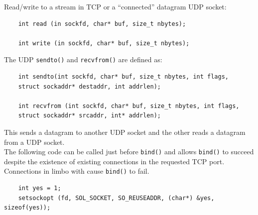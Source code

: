 \documentclass[twoside]{article}
\begin{document}
Read/write to a stream in TCP or a ``connected'' datagram UDP socket:
\begin{lstlisting}
    int read (in sockfd, char* buf, size_t nbytes);

    int write (in sockfd, char* buf, size_t nbytes);
\end{lstlisting}
The UDP \texttt{sendto()} and \texttt{recvfrom()} are defined as:
\begin{lstlisting}
    int sendto(int sockfd, char* buf, size_t nbytes, int flags, 
    struct sockaddr* destaddr, int addrlen);

    int recvfrom (int sockfd, char* buf, size_t nbytes, int flags,
    struct sockaddr* srcaddr, int* addrlen);
\end{lstlisting}
This sends a datagram to another UDP socket and the other reads a datagram
from a UDP socket.\\

The following code can be called just before \texttt{bind()} and allows 
\texttt{bind()} to succeed despite the existence of existing connections in the
requested TCP port. Connections in limbo with cause \texttt{bind()} to fail.
\begin{lstlisting}
    int yes = 1;
    setsockopt (fd, SOL_SOCKET, SO_REUSEADDR, (char*) &yes, sizeof(yes));
\end{lstlisting}
\end{document}

